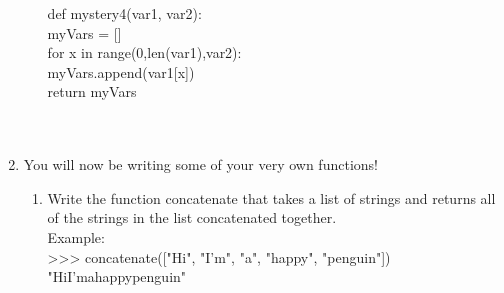 \documentclass[11pt, letterpaper, onecolumn, oneside, final]{article}
\begin{document}
\begin{enumerate}
\begin{enumerate}
{{def mystery4(var1, var2):\\
\hspace*{8mm}myVars = []\\
\hspace*{8mm}for x in range(0,len(var1),var2):\\
\hspace*{16mm}myVars.append(var1[x])\\
\hspace*{8mm} return myVars
}}\\\\\\
\end{enumerate}
    
    
\item You will now be writing some of your very own functions!

\begin{enumerate}
\item Write the function {\consolas concatenate} that takes a list of strings and returns all of the strings in the list concatenated together.\\ Example:\\
{\consolas >>> concatenate(["Hi", "I'm", "a", "happy", "penguin"])\\ "HiI'mahappypenguin"}\\


\end{enumerate}
\end{enumerate}
\end{document}
